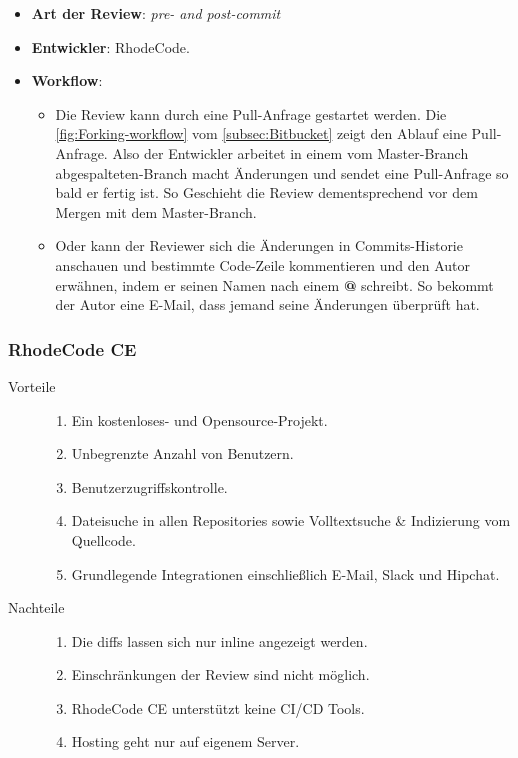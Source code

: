 \begin{itemize}
	\item \textbf{Art der Review}: \textit{pre- and post-commit}
	\item \textbf{Entwickler}: RhodeCode.
	\item \textbf{Workflow}:
	\begin{itemize}
		\item Die Review kann durch eine Pull-Anfrage gestartet werden. Die \cref{fig:Forking-workflow} vom \cref{subsec:Bitbucket} zeigt den Ablauf
			eine Pull-Anfrage. Also der Entwickler arbeitet in einem vom Master-Branch abgespalteten-Branch macht Änderungen und sendet eine Pull-Anfrage so bald er fertig ist. 
			So Geschieht die Review dementsprechend vor dem Mergen mit dem Master-Branch.
		\item Oder kann der Reviewer sich die Änderungen in Commits-Historie anschauen und bestimmte Code-Zeile kommentieren und den Autor erwähnen, indem er seinen Namen nach einem 
			\textbf{@} schreibt. So bekommt der Autor eine E-Mail, dass jemand seine Änderungen überprüft hat.
	\end{itemize}
\end{itemize}

\subsubsection{RhodeCode CE}
\label{subsubsec:RhodeCode CE}

\begin{description}
	\item [Vorteile] \hfill
		\begin{enumerate}
			\item Ein kostenloses- und Opensource-Projekt.
			\item Unbegrenzte Anzahl von Benutzern.
			\item Benutzerzugriffskontrolle.
			\item Dateisuche in allen Repositories sowie Volltextsuche \& Indizierung vom Quellcode.
			\item Grundlegende Integrationen einschließlich E-Mail, Slack und Hipchat.
		\end{enumerate}
	\item [Nachteile] \hfill
		\begin{enumerate}
			\item Die diffs lassen sich nur inline angezeigt werden.
			\item Einschränkungen der Review sind nicht möglich.
			\item RhodeCode CE unterstützt keine \ac{CI}/\ac{CD} Tools.
			\item Hosting geht nur auf eigenem Server.
		\end{enumerate}
\end{description}

